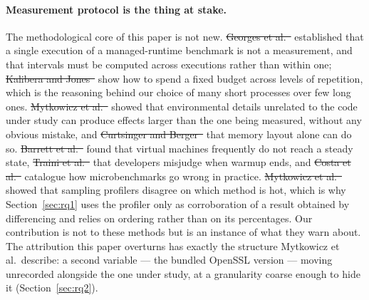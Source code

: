 \documentclass[pdflatex,sn-basic,twocolumn]{sn-jnl}%
\providecommand{\DIFdel}[1]{{\protect\color{red}\sout{#1}}}                      %
\providecommand{\DIFaddbegin}{} %
\providecommand{\DIFaddend}{} %
\providecommand{\DIFdelbegin}{} %
\providecommand{\DIFdelend}{} %
\newcommand{\DIFscaledelfig}{0.5}
\newlength{\DIFdelgraphicswidth} %
\newlength{\DIFdelgraphicsheight} %
\newcommand{\DIFaddincludegraphics}[2][]{{\color{blue}\fbox{\DIFOincludegraphics[#1]{#2}}}} %
\newcommand{\DIFdelincludegraphics}[2][]{%
\sbox{\DIFdelgraphicsbox}{\DIFOincludegraphics[#1]{#2}}%
\settoboxwidth{\DIFdelgraphicswidth}{\DIFdelgraphicsbox} %
\settoboxtotalheight{\DIFdelgraphicsheight}{\DIFdelgraphicsbox} %
\scalebox{\DIFscaledelfig}{%
\parbox[b]{\DIFdelgraphicswidth}{\usebox{\DIFdelgraphicsbox}\\[-\baselineskip] \rule{\DIFdelgraphicswidth}{0em}}\llap{\resizebox{\DIFdelgraphicswidth}{\DIFdelgraphicsheight}{%
\setlength{\unitlength}{\DIFdelgraphicswidth}%
\begin{picture}(1,1)%
\thicklines\linethickness{2pt} %
{\color[rgb]{1,0,0}\put(0,0){\framebox(1,1){}}}%
{\color[rgb]{1,0,0}\put(0,0){\line( 1,1){1}}}%
{\color[rgb]{1,0,0}\put(0,1){\line(1,-1){1}}}%
\end{picture}%
}\hspace*{3pt}}} %
} %
\DeclareRobustCommand{\DIFaddbegin}{\DIFOaddbegin \let\includegraphics\DIFaddincludegraphics} %
\DeclareRobustCommand{\DIFaddend}{\DIFOaddend \let\includegraphics\DIFOincludegraphics} %
\DeclareRobustCommand{\DIFdelbegin}{\DIFOdelbegin \let\includegraphics\DIFdelincludegraphics} %
\DeclareRobustCommand{\DIFdelend}{\DIFOaddend \let\includegraphics\DIFOincludegraphics} %
\begin{document}
\paragraph{Measurement protocol is the thing at stake.} The methodological core
of this paper is not new. \DIFdelbegin \DIFdel{Georges et al.~}%
\DIFdelend \DIFaddbegin \citet{georges2007statistically}
\DIFaddend established that a single execution of a managed-runtime benchmark is not a
measurement, and that intervals must be computed across executions rather than
within one; \DIFdelbegin \DIFdel{Kalibera and Jones~}%
\DIFdelend \DIFaddbegin \citet{kalibera2013rigorous} \DIFaddend show how to spend a
fixed budget across levels of repetition, which is the reasoning behind our
choice of many short processes over few long ones. \DIFdelbegin \DIFdel{Mytkowicz et
al.~}%
\DIFdelend \DIFaddbegin \citet{mytkowicz2009wrong} \DIFaddend showed that environmental details unrelated to
the code under study can produce effects larger than the one being measured,
without any obvious mistake, and \DIFdelbegin \DIFdel{Curtsinger and
Berger~}%
\DIFdelend \DIFaddbegin \citet{curtsinger2013stabilizer} \DIFaddend that memory layout alone can do so.
\DIFdelbegin \DIFdel{Barrett et al.~}%
\DIFdelend \DIFaddbegin \citet{barrett2017warmup} \DIFaddend found that virtual machines frequently
do not reach a steady state, \DIFdelbegin \DIFdel{Traini et al.~}%
\DIFdelend \DIFaddbegin \citet{traini2023steady} \DIFaddend that
developers misjudge when warmup ends, and \DIFdelbegin \DIFdel{Costa et al.~}%
\DIFdelend \DIFaddbegin \citet{costa2021wrong}
\DIFaddend catalogue how microbenchmarks go wrong in practice. \DIFdelbegin \DIFdel{Mytkowicz et
al.~}%
\DIFdelend \DIFaddbegin \citet{mytkowicz2010profilers} \DIFaddend showed that sampling profilers disagree on
which method is hot, which is why Section~\ref{sec:rq1} uses the profiler only
as corroboration of a result obtained by differencing and relies on ordering
rather than on its percentages. Our contribution is not to these methods but is
an instance of what they warn about. The attribution this paper overturns has
exactly the structure Mytkowicz et al.\ describe: a second variable --- the
bundled OpenSSL version --- moving unrecorded alongside the one under study, at
a granularity coarse enough to hide it (Section~\ref{sec:rq2}).
\end{document}
